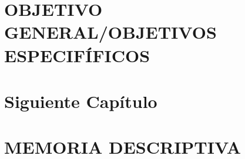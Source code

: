 \documentclass[12pt,a4paper,oneside]{report}
\begin{document}
	\begin{titlepage}
		
	\end{titlepage}
	
	

	\chapter*{}
	
	
	\chapter*{}
	
	
	\chapter{}
	
	
	\renewcommand{\contentsname}{ÍNDICE}
	\tableofcontents
	
	\chapter{}
%	

	\chapter{}
%	
	
	\chapter{OBJETIVO GENERAL/OBJETIVOS ESPECIFÍFICOS}
%	
	
	
	\setupname[CAPÍTULO]
	\chapter{Siguiente Capítulo}
	
	
	\chapter{MEMORIA DESCRIPTIVA}
	
	
\end{document}
